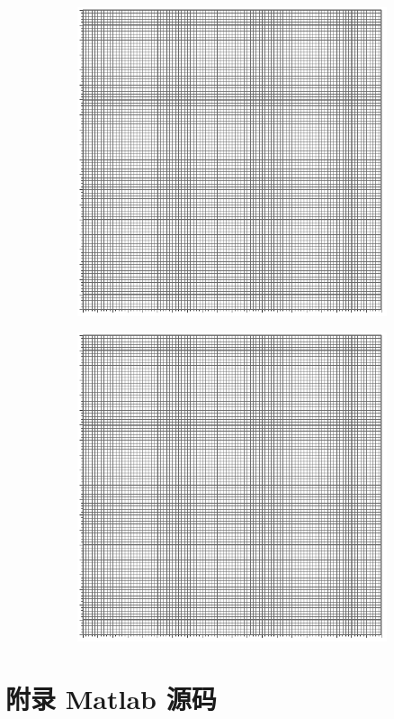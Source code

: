 \documentclass[UTF8]{article}
\begin{document}
\begin{figure}[H]\centering
    \begin{subfigure}[b]{0.5\columnwidth}\centering
        \includegraphics[width=\columnwidth]{assets/100x100.pdf}
    \end{subfigure}\hfill
    \begin{subfigure}[b]{0.5\columnwidth}\centering
        \includegraphics[width=\columnwidth]{assets/100x100.pdf}
    \end{subfigure}
\end{figure}


\newpage
\section*{附录 \hspace*{10pt} Matlab 源码}

\end{document}

